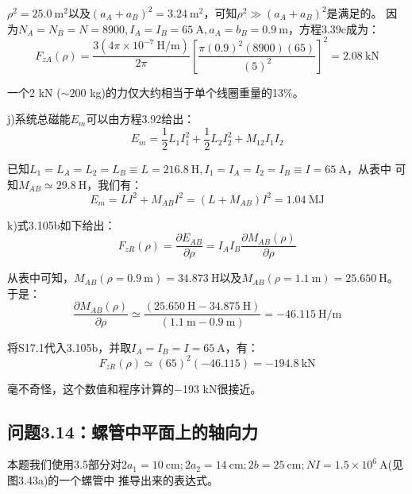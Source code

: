 $\rho^2=25.0\ \mathrm{m^2}$以及$(a_A+a_B)^2=3.24 \ \mathrm{m^2}$，可知$\rho^2\gg(a_A+a_B)^2$是满足的。
因为$N_A=N_B=N =8900, I_A=I_B=65\ \mathrm{A}, a_A=b_B=0.9\ \mathrm{m}$，方程3.39c成为：
\begin{equation*}
F_{zA}(\rho)=\frac{3(4\pi\times 10^{-7}\ \mathrm{H/m})}{2\pi}\left[\frac{\pi(0.9)^2(8900)(65)}{(5)^2}\right]^2=2.08\ \mathrm{kN}
\end{equation*}

一个2 kN ($\sim 200$ kg)的力仅大约相当于单个线圈重量的13\%。

j)系统总磁能$E_m$可以由方程3.92给出：
\begin{equation*}
E_{m}=\frac{1}{2}L_{1}I_{1}^{2}+\frac{1}{2}L_{2}I_{2}^{2}+M_{12}I_{1}I_{2}\tag{3.92}%
\end{equation*}

已知$L_1 = L_A = L_2 = L_B\equiv  L = 216.8\ \mathrm{H}, I_1 = I_A = I_2 = I_B\equiv I = 65\ \mathrm{A}$，从表中
可知$M_{AB}\simeq 29.8 \ \mathrm{H}$，我们有：
\begin{equation*}
	E_m=LI^2+M_{AB}I^2=(L+M_{AB})I^2=1.04\ \mathrm{MJ}
\end{equation*}

k)式3.105b如下给出：
\begin{equation*}
F_{zR}(\rho)=\frac{\partial E_{AB}}{\partial \rho}=I_{A}I_{B}\frac{\partial M_{AB}(\rho)}{\partial\rho}\tag{3.105b}%
\end{equation*}

从表中可知，$M_{AB}(\rho=0.9\ \mathrm{m})=34.873 \ \mathrm{H}$以及$M_{AB}(\rho=1.1\ \mathrm{m})=25.650\ \mathrm{H}$。于是：
\begin{equation*}
\frac{\partial M_{AB}(\rho)}{\partial\rho}\simeq\frac{(25.650 \ \mathrm{H}-34.87 5\ \mathrm{H})}{(1.1\ \mathrm{m}-0.9\ \mathrm{m})}=-46.115\ \mathrm{H/m}\tag{S17.1}%
\end{equation*}

将S17.1代入3.105b，并取$I_A=I_B=I =65\ \mathrm{A}$，有：
\begin{equation*}
F_{zR}(\rho)\simeq (65)^2(-46.115)=-194.8\ \mathrm{kN}
\end{equation*}

毫不奇怪，这个数值和程序计算的−193 kN很接近。



\subsection{问题3.14：螺管中平面上的轴向力}
本题我们使用3.5部分对$2a_1 = 10\ \mathrm{cm}; 2a_2 = 14\ \mathrm{cm}; 2b = 25\ \mathrm{cm}; NI = 1.5×10^6\ \mathrm{A}$(见图3.43a)的一个螺管中
推导出来的表达式。

